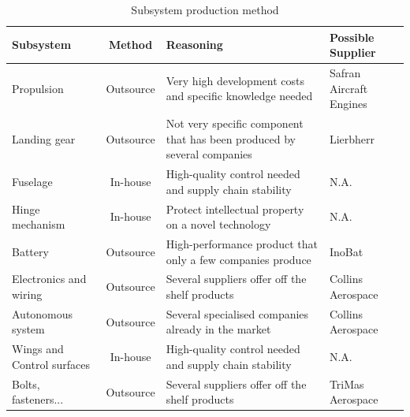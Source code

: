 \begin{table}[ht]
\centering
\caption{Subsystem production method}
\label{prod2}
\begin{tabular}{p{3.2cm}cp{6.5cm}l}
\toprule
\textbf{Subsystem}                          & \textbf{Method} & \textbf{Reasoning}                                                                      & \textbf{Possible Supplier} \\ \midrule
{Propulsion}                                                            & {Outsource}                               & {Very high development costs and specific knowledge needed}               & {Safran Aircraft Engines}                            \\ \hline
{Landing gear}                                                          & {Outsource}                               & {Not very specific component that has been produced by several companies} & {Lierbherr}                                          \\ \hline
{Fuselage}                                                             & {In-house}                                & {High-quality control needed and supply chain stability}                  & {N.A.}                                                \\ \hline
{Hinge mechanism}            & {In-house}                                & {Protect intellectual property on a novel technology}                     & {N.A.}                                                \\ \hline
{Battery}                                                               & {Outsource}                               & {High-performance product that only a few companies produce}             & {InoBat}                                             \\ \hline
{Electronics and wiring}     & {Outsource}                               & {Several suppliers offer off the shelf products}                          & {Collins Aerospace}                                  \\ \hline
{Autonomous system}           & {Outsource}                               & {Several specialised companies already in the market}                     & {Collins Aerospace}                                  \\ \hline
{Wings and Control surfaces} & {In-house}                                & {High-quality control needed and supply chain stability}                  & {N.A.}                                                \\ \hline
{Bolts, fasteners...}                                                   & {Outsource}                               & {Several suppliers offer off the shelf products}                          & {TriMas Aerospace}                                   \\ \bottomrule
\end{tabular}
\end{table}

